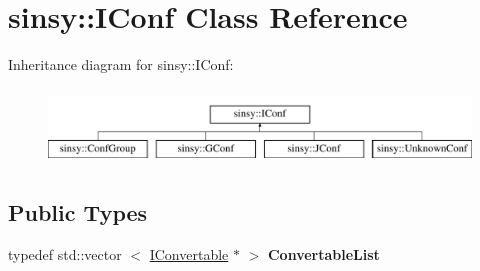 \hypertarget{classsinsy_1_1IConf}{\section{sinsy\-:\-:\-I\-Conf \-Class \-Reference}
\label{classsinsy_1_1IConf}
}
\-Inheritance diagram for sinsy\-:\-:\-I\-Conf\-:\begin{figure}[H]
\begin{center}
\leavevmode
\includegraphics[height=2.000000cm]{classsinsy_1_1IConf}
\end{center}
\end{figure}
\subsection*{\-Public \-Types}
\begin{DoxyCompactItemize}
\item 
\hypertarget{classsinsy_1_1IConf_aef94406d617b334239fd77ed2e152517}{typedef std\-::vector\*
$<$ \hyperlink{classsinsy_1_1IConvertable}{\-I\-Convertable} $\ast$ $>$ {\bfseries \-Convertable\-List}}\label{classsinsy_1_1IConf_aef94406d617b334239fd77ed2e152517}

\end{DoxyCompactItemize}
